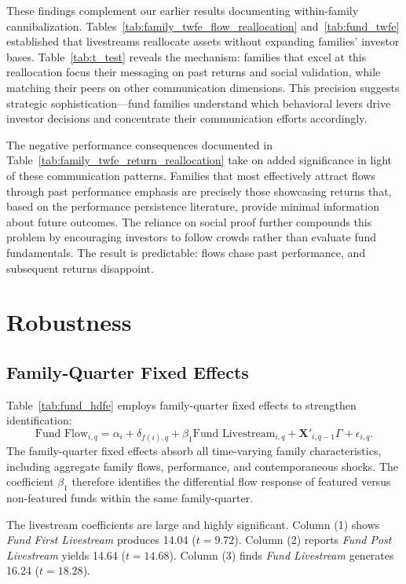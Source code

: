 \documentclass[12pt]{article}
\begin{document}
These findings complement our earlier results documenting within-family cannibalization. Tables~\ref{tab:family_twfe_flow_reallocation} and~\ref{tab:fund_twfe} established that livestreams reallocate assets without expanding families' investor bases. Table~\ref{tab:t_test} reveals the mechanism: families that excel at this reallocation focus their messaging on past returns and social validation, while matching their peers on other communication dimensions. This precision suggests strategic sophistication—fund families understand which behavioral levers drive investor decisions and concentrate their communication efforts accordingly.

The negative performance consequences documented in Table~\ref{tab:family_twfe_return_reallocation} take on added significance in light of these communication patterns. Families that most effectively attract flows through past performance emphasis are precisely those showcasing returns that, based on the performance persistence literature, provide minimal information about future outcomes. The reliance on social proof further compounds this problem by encouraging investors to follow crowds rather than evaluate fund fundamentals. The result is predictable: flows chase past performance, and subsequent returns disappoint.


\section{Robustness}\label{sec:robustness}

\subsection{Family-Quarter Fixed Effects}\label{subsec:fund_hdfe}

Table~\ref{tab:fund_hdfe} employs family-quarter fixed effects to strengthen identification:
\begin{equation}
    \label{eq:fund_hdfe}
    \text{Fund Flow}_{i,q} = \alpha_i + \delta_{f(i),q} + \beta_1 \text{Fund Livestream}_{i,q} + \mathbf{X}'_{i,q-1} \Gamma + \epsilon_{i,q}.
\end{equation}
The family-quarter fixed effects absorb all time-varying family characteristics, including aggregate family flows, performance, and contemporaneous shocks. The coefficient $\beta_1$ therefore identifies the differential flow response of featured versus non-featured funds within the same family-quarter.

The livestream coefficients are large and highly significant. Column (1) shows \textit{Fund First Livestream} produces 14.04 ($t = 9.72$). Column (2) reports \textit{Fund Post Livestream} yields 14.64 ($t = 14.68$). Column (3) finds \textit{Fund Livestream} generates 16.24 ($t = 18.28$).
\end{document}
